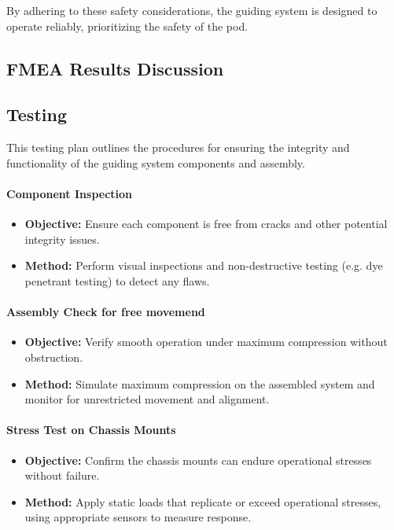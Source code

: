 By adhering to these safety considerations, the guiding system is designed to operate reliably, prioritizing the safety of the pod.



\subsection{FMEA Results Discussion}

\subsection{Testing}

This testing plan outlines the procedures for ensuring the integrity and functionality of the guiding system components and assembly.
\paragraph{Component Inspection}
\begin{itemize}
    \item \textbf{Objective:} Ensure each component is free from cracks and other potential integrity issues.
    \item \textbf{Method:} Perform visual inspections and non-destructive testing (e.g.  dye penetrant testing) to detect any flaws.
\end{itemize}

\paragraph{Assembly Check for free movemend}
\begin{itemize}
    \item \textbf{Objective:} Verify smooth operation under maximum compression without obstruction.
    \item \textbf{Method:} Simulate maximum compression on the assembled system and monitor for unrestricted movement and alignment.
\end{itemize}

\paragraph{Stress Test on Chassis Mounts}
\begin{itemize}
    \item \textbf{Objective:} Confirm the chassis mounts can endure operational stresses without failure.
    \item \textbf{Method:} Apply static loads that replicate or exceed operational stresses, using appropriate sensors to measure response.
\end{itemize}
